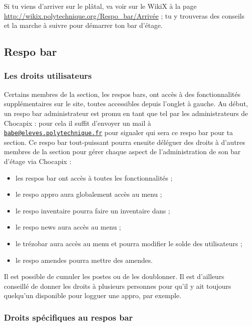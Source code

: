 \documentclass[12pt,french]{article}
\begin{document}
Si tu viens d'arriver sur le plâtal, va voir sur le WikiX à la page \url{http://wikix.polytechnique.org/Respo_bar/Arrivée} ; tu y trouveras des conseils et la marche à suivre pour démarrer ton bar d'étage.

\subsection{Respo bar}

\subsubsection{Les droits utilisateurs}

Certains membres de la section, les respos bars, ont accès à des fonctionnalités supplémentaires sur le site, toutes accessibles depuis l'onglet  à gauche. Au début, un respo bar administrateur est promu en tant que tel par les administrateurs de Chocapix : pour cela il suffit d'envoyer un mail à \href{mailto:babe@eleves.polytechnique.fr}{\texttt{babe@eleves.polytechnique.fr}} pour signaler qui sera ce respo bar pour ta section. Ce respo bar tout-puissant pourra ensuite déléguer des droits à d'autres membres de la section pour gérer chaque aspect de l'administration de son bar d'étage via Chocapix :
\begin{itemize}
	\item les respos bar ont accès à toutes les fonctionnalités ;
	\item le respo appro aura globalement accès au menu  ;
	\item le respo inventaire pourra faire un inventaire dans  ;
	\item le respo news aura accès au menu  ;
	\item le trézobar aura accès au menu  et pourra modifier le solde des utilisateurs ;
	\item le respo amendes pourra mettre des amendes.
\end{itemize}
Il est possible de cumuler les postes ou de les doublonner. Il est d'ailleurs conseillé de donner les droits à plusieurs personnes pour qu'il y ait toujours quelqu'un disponible pour logguer une appro, par exemple.

\subsubsection{Droits spécifiques au respos bar}
\end{document}
